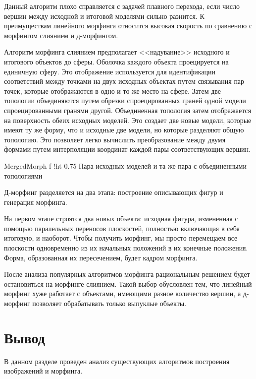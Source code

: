 Данный алгоритм плохо справляется с задачей плавного перехода, если число вершин между исходной и итоговой моделями сильно разнится. К преимуществам линейного морфинга относится высокая скорость по сравнению с морфингом слиянием и д-морфингом.

Алгоритм морфинга слиянием предполагает <<надувание>> исходного и итогового объектов до сферы. Оболочка каждого объекта проецируется на единичную сферу. Это отображение используется для идентификации соответствий между точками на двух исходных объектах путем связывания пар точек, которые отображаются в одно и то же место на сфере. Затем две топологии объединяются путем обрезки спроецированных граней одной модели спроецированными гранями другой. Объединенная топология затем отображается на поверхность обеих исходных моделей. Это создает две новые модели, которые имеют ту же форму, что и исходные две модели, но которые разделяют общую топологию. Это позволяет легко вычислить преобразование между двумя формами путем интерполяции координат каждой пары соответствующих вершин.

{MergedMorph}
{f}
{!ht}
{0.75\textwidth}
{Пара исходных моделей и та же пара с объединенными топологиями}

\leavevmode

Д-морфинг разделяется на два этапа: построение описывающих фигур и генерация морфинга.

На первом этапе строятся два новых объекта: исходная фигура, измененная с помощью паралельных переносов плоскостей, полностью включающая в себя итоговую, и наоборот.  Чтобы получить морфинг, мы просто перемещаем все плоскости одновременно из их начальных положений в их конечные положения. Форма, образованная их пересечением, будет кадром морфинга.~\cite{DMorph}~\cite{Merging_Morph}

\leavevmode

После анализа популярных алгоритмов морфинга рациональным решением будет остановиться на морфинге слиянием. Такой выбор обусловлен тем, что линейный морфинг хуже работает с объектами, имеющими разное количество вершин, а д-морфинг позволяет обрабатывать только выпуклые объекты.

\section*{Вывод}
В данном разделе проведен анализ существующих алгоритмов построения изображений и морфинга.